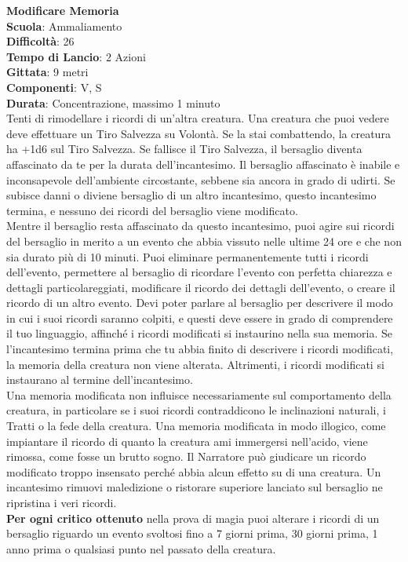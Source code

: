 \begin{multicols}{2}
\medskip\textbf{Modificare Memoria}\\
\textbf{Scuola}: Ammaliamento\\
\textbf{Difficoltà}: 26\\
\textbf{Tempo di Lancio}: 2 Azioni\\
\textbf{Gittata}: 9 metri\\
\textbf{Componenti}: V, S\\
\textbf{Durata}: Concentrazione, massimo 1 minuto\\
Tenti di rimodellare i ricordi di un'altra creatura. Una creatura che puoi vedere deve effettuare un Tiro Salvezza su Volontà. Se la stai combattendo, la creatura ha +1d6 sul Tiro Salvezza. Se fallisce il Tiro Salvezza, il bersaglio diventa affascinato da te per la durata dell'incantesimo. Il bersaglio affascinato è inabile e inconsapevole dell'ambiente circostante, sebbene sia ancora in grado di udirti. Se subisce danni o diviene bersaglio di un altro incantesimo, questo incantesimo termina, e nessuno dei ricordi del bersaglio viene modificato.\\
Mentre il bersaglio resta affascinato da questo incantesimo, puoi agire sui ricordi del bersaglio in merito a un evento che abbia vissuto nelle ultime 24 ore e che non sia durato più di 10 minuti. Puoi eliminare permanentemente tutti i ricordi dell'evento, permettere al bersaglio di ricordare l'evento con perfetta chiarezza e dettagli particolareggiati, modificare il ricordo dei dettagli dell'evento, o creare il ricordo di un altro evento. Devi poter parlare al bersaglio per descrivere il modo in cui i suoi ricordi saranno colpiti, e questi deve essere in grado di comprendere il tuo linguaggio, affinché i ricordi modificati si instaurino nella sua memoria. Se l'incantesimo termina prima che tu abbia finito di descrivere i ricordi modificati, la memoria della creatura non viene alterata. Altrimenti, i ricordi modificati si instaurano al termine dell'incantesimo.\\
Una memoria modificata non influisce necessariamente sul comportamento della creatura, in particolare se i suoi ricordi contraddicono le inclinazioni naturali, i Tratti o la fede della creatura. Una memoria modificata in modo illogico, come impiantare il ricordo di quanto la creatura ami immergersi nell'acido, viene rimossa, come fosse un brutto sogno. Il Narratore può giudicare un ricordo modificato troppo insensato perché abbia alcun effetto su di una creatura. Un incantesimo rimuovi maledizione o ristorare superiore lanciato sul bersaglio ne ripristina i veri ricordi.\\
\textbf{Per ogni critico ottenuto} nella prova di magia puoi alterare i ricordi di un bersaglio riguardo un evento svoltosi fino a 7 giorni prima, 30 giorni prima, 1 anno prima o qualsiasi punto nel passato della creatura.


\end{multicols}
